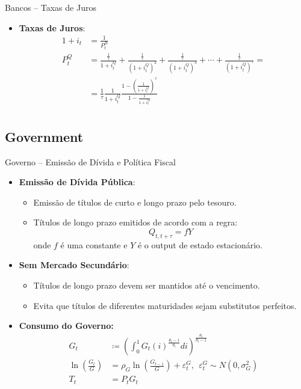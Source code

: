 \documentclass{beamer}
\begin{document}
\begin{frame}{Bancos -- Taxas de Juros}
    \begin{itemize}
        \item \textbf{Taxas de Juros}:
        \begin{align*}
            1 + i_t &= \frac{1}{P^B_t} \tag{15}\\
            P_{t}^{Q} &= \frac{\frac{1}{\tau}}{1+i_{t}^{Q}}+\frac{\frac{1}{\tau}}{\left(1+i_{t}^{Q}\right)^{2}}+\frac{\frac{1}{\tau}}{\left(1+i_{t}^{Q}\right)^{3}}+\cdots+\frac{\frac{1}{\tau}}{\left(1+i_{t}^{Q}\right)^{\tau}}=\\
            &= \frac{1}{\tau}\frac{1}{1+i_{t}^{Q}}\frac{1-\left(\frac{1}{1+i_{t}^{Q}}\right)^{\tau}}{1-\frac{1}{1+i_{t}^{Q}}} \tag{16}\\
        \end{align*}
    \end{itemize}
\end{frame}


\subsection{Government}

\begin{frame}{Governo -- Emissão de Dívida e Política Fiscal}
    \begin{itemize}
        \item \textbf{Emissão de Dívida Pública}:
        \begin{itemize}
            \item Emissão de títulos de curto e longo prazo pelo tesouro.
            \item Títulos de longo prazo emitidos de acordo com a regra:
            \[
            Q_{t,t+\tau} = f Y
            \]
            onde \( f \) é uma constante e \( Y \) é o output de estado estacionário.
        \end{itemize}
        \item \textbf{Sem Mercado Secundário}:
        \begin{itemize}
            \item Títulos de longo prazo devem ser mantidos até o vencimento.
            \item Evita que títulos de diferentes maturidades sejam substitutos perfeitos.
        \end{itemize}
        \item \textbf{Consumo do Governo:}
        \begin{align*}
            G_t &\coloneqq \left(\int_0^1G_t(i)^{\frac{\theta_t - 1}{\theta_t}} di\right)^{\frac{\theta_t}{\theta_t - 1}}\\
            \ln \left(\frac{G_t}{G}\right) &= \rho_G \ln \left(\frac{G_{t-1}}{G}\right) + \varepsilon_t^G, ~~ \varepsilon_t^G \sim N(0, \sigma^2_G)\tag{18}\\
            T_t &= P_tG_t
        \end{align*}
    \end{itemize}
\end{frame}
\end{document}
